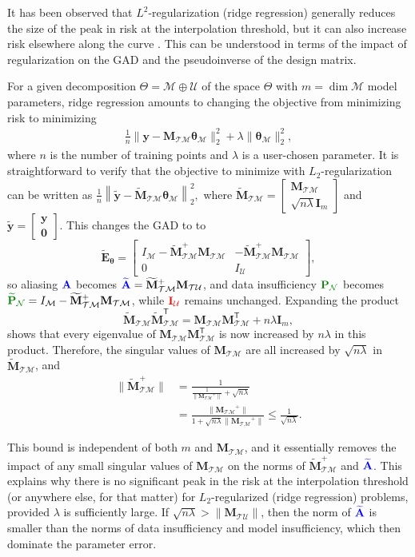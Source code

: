 \documentclass[twocolumn,aps,prx,superscriptaddress,10pt]{revtex4-2}
\newcommand{\by}{\bm{y}}
\newcommand{\0}{\bm{0}}
\newcommand{\btheta}{\boldsymbol{\theta}}
\newcommand{\M}{\mathcal{M}} %
\newcommand{\K}{\mathcal{N}} %
\newcommand{\T}{\mathcal{T}} %
\newcommand{\U}{\mathcal{U}} %
\newcommand{\bbA}{{\color{blue}{\mathbf{A}}}}  %
\newcommand{\bbAt}{{\color{blue}{\widetilde{\mathbf{A}}}}}  %
\newcommand{\bbIU}{{\color{red}{\bbI_{\U}}}}  %
\newcommand{\bbPN}{{\color{Green}{\mathbf{P}_{\K}}}} %
\newcommand{\bbPNt}{{\color{Green}{\widetilde{\mathbf{P}}_{\K}}}} %
\newcommand{\bbE}{\mathbf{E}}
\newcommand{\bbI}{\mathbf{I}}
\newcommand{\bbM}{\mathbf{M}}
\newcommand{\MTM}{\bbM_{\T\M}}
\newcommand{\tMTM}{\widetilde{\bbM}_{\T\M}}
\newcommand{\MTU}{\bbM_{\T\U}}
\newcommand{\trp}{^{\mathsf{T}}}  %
\begin{document}
It has been observed that $L^2$-regularization (ridge regression) generally reduces the size of the peak in risk at the interpolation threshold, but it can also increase risk elsewhere along the curve \cite{MeiMontanari, yilmaz, nakkiran}.  This can be understood in terms of the impact of regularization on the GAD and the pseudoinverse of the design matrix.

For a given decomposition $\Theta = \M \oplus \U$ of the space $\Theta$ with $m =\dim \M$ model parameters, ridge regression  amounts to changing the objective from minimizing risk to minimizing
\begin{align}
\frac{1}{n}\| \by - \MTM \btheta_{\M}\|_2^2 + \lambda \| \btheta_{\M} \|_2^2, 
\end{align}
where $n$ is the number of training points and $\lambda$ is a user-chosen parameter.
It is straightforward to verify that the objective to minimize with $L_2$-regularization can be written as 
$\frac{1}{n}\left\| \widetilde{\by} - \tMTM \btheta_{\M} \right\|_2^2,\label{eq:2-regularize-as-LM}$
where $\tMTM = \left[\begin{smallmatrix}\MTM \\ \sqrt{n\lambda} \bbI_m\end{smallmatrix}\right]$ and $\widetilde{\by} = \left[\begin{smallmatrix}\by\\ \0 \end{smallmatrix}\right]$.  This changes the GAD to  to 
\[
\widetilde{\bbE}_{\btheta} = \begin{bmatrix}
I_\M  - \tMTM^+ \MTM & -\tMTM^+ \MTM\\
0 & I_\U
\end{bmatrix},
\]
so aliasing $\bbA$ becomes $\bbAt = \tMTM^+ \MTU$, and data insufficiency $\bbPN$ becomes $\bbPNt = I_\M  - \tMTM^+ \MTM$, while $\bbIU$ remains unchanged.
Expanding the product 
\[
\tMTM \tMTM\trp = \MTM\MTM\trp + n\lambda \bbI_m,
\] 
shows that every eigenvalue of $\MTM\MTM\trp$ is now increased by $n\lambda$ in this product.  Therefore, the singular values of $\MTM$ are all increased by $\sqrt{n\lambda}$ in $\tMTM$, and 
\begin{align*}
\|\tMTM^+\| 
&= \frac{1}{\frac{1}{\|{\MTM}^+\|} + \sqrt{n\lambda}}\\
&= \frac{\|{\MTM}^+\|}{1 + \sqrt{n\lambda} \|{\MTM}^+\|} \le \frac{1}{\sqrt{n \lambda}}.
\end{align*}


This bound is independent of both $m$ and $\MTM$, and 
it essentially removes the impact of any small singular values of $\MTM$ on the norms of $\tMTM^+$ and $\bbAt$. This explains why there is no significant peak in the risk at the interpolation threshold (or anywhere else, for that matter) for $L_2$-regularized (ridge regression) problems, provided $\lambda$ is sufficiently large. 
If $\sqrt{n \lambda} > \|\MTU\|$, then the norm of $\bbAt$ is smaller than the norms of data insufficiency and model insufficiency, which then dominate the parameter error.
\end{document}
